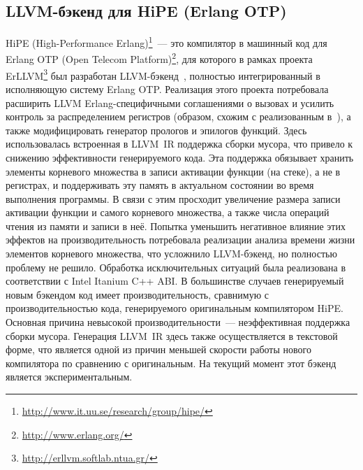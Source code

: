 \documentclass[a4paper, 12pt]{article}
\begin{document}
\subsection{LLVM-бэкенд для HiPE (Erlang OTP)}
HiPE (High-Performance Erlang)\footnote{\url{http://www.it.uu.se/research/group/hipe/}}~--- это компилятор в машинный
код для
Erlang OTP (Open Telecom Platform)\footnote{\url{http://www.erlang.org/}}, для которого в рамках проекта
ErLLVM\footnote{\url{http://erllvm.softlab.ntua.gr/}} был разработан LLVM-бэкенд~\cite{Erlang}, полностью
интегрированный в исполняющую систему Erlang OTP. Реализация этого проекта потребовала расширить LLVM
Erlang-специфичными соглашениями о вызовах и усилить контроль за распределением регистров (образом, схожим с
реализованным в~\cite{GHC}), а также модифицировать генератор прологов и эпилогов функций. Здесь использовалась
встроенная в LLVM~IR поддержка сборки мусора, что привело к снижению эффективности генерируемого кода. Эта поддержка
обязывает хранить элементы корневого множества в записи активации функции (на стеке), а не в регистрах, и поддерживать
эту память в актуальном состоянии во время выполнения программы. В связи с этим просходит увеличение размера записи
активации функции и самого корневого множества, а также числа операций чтения из памяти и записи в неё. Попытка
уменьшить негативное влияние этих эффектов на производительность потребовала реализации анализа времени жизни элементов
корневого множества, что усложнило LLVM-бэкенд, но полностью проблему не решило. Обработка исключительных ситуаций была
реализована в соответствии с Intel Itanium C++ ABI. В большинстве случаев генерируемый новым бэкендом код имеет
производительность, сравнимую с производительностью кода, генерируемого оригинальным компилятором HiPE. Основная причина
невысокой производительности~--- неэффективная поддержка сборки мусора. Генерация LLVM~IR
здесь также осуществляется в текстовой форме, что является одной из причин меньшей скорости работы нового компилятора
по сравнению с оригинальным. На текущий момент этот бэкенд является экспериментальным.
\end{document}
